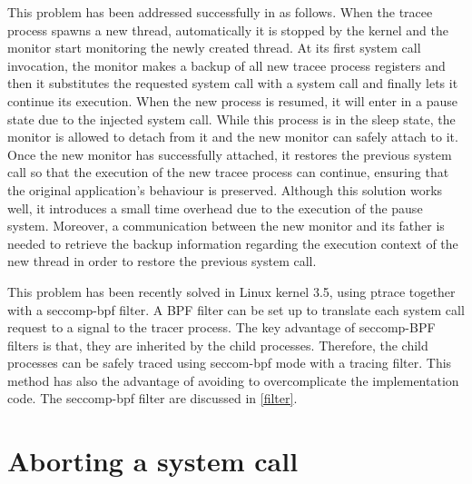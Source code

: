 This problem has been addressed successfully in \cite{orchestra} as follows.  When the tracee process spawns a new thread, automatically it is stopped by the kernel and the monitor start monitoring the newly created thread. At its first system call invocation, the monitor makes a backup of all new tracee process registers and then it substitutes the requested system call with a  system call and finally lets it continue its execution.  When the new process is resumed, it will enter in a pause state due to the injected system call. While this process is in the sleep state, the monitor is allowed to detach from it and the new monitor can safely attach to it. Once the new monitor has successfully attached, it restores the previous system call so that the execution of the new tracee process can continue, ensuring that the original application's behaviour is preserved. Although this solution works well, it introduces a small time overhead due to the execution of the pause system.  Moreover, a communication between the new monitor and its father is needed to retrieve the backup information regarding the execution context of the new thread in order to restore the previous system call. 

This problem has been recently solved in Linux kernel 3.5, using ptrace together with a seccomp-bpf filter. A BPF filter can be set up to translate each system call request to a signal to the tracer process. The key advantage of seccomp-BPF filters  is that, they are inherited by the child processes. Therefore, the child processes can be safely traced using seccom-bpf mode with a tracing filter. This method has also the advantage of avoiding to overcomplicate the implementation code. The seccomp-bpf filter are discussed in \ref{filter}. 

\section{Aborting a system call}
\label{aborting_systemcall}

